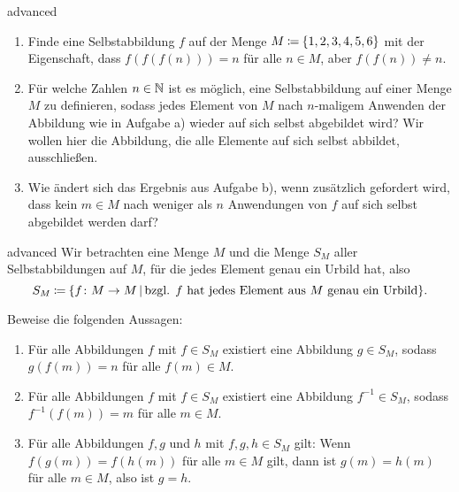 \documentclass[../funktionen.tex]{subfiles}
\begin{document}
\begin{exercise}{advanced}
    \begin{enumerate}
        \item Finde eine Selbstabbildung $f$ auf der Menge $M\mathbin{\coloneqq}\{1,2,3,4,5,6\}$ mit der Eigenschaft, dass $f(f(f(n)))=n$ für alle $n\in M$, aber $f(f(n))\neq n$.
        \item Für welche Zahlen $n\in\mathbb{N}$ ist es möglich, eine Selbstabbildung auf einer Menge $M$ zu definieren, sodass jedes Element von $M$ nach $n$-maligem Anwenden der Abbildung wie in Aufgabe a) wieder auf sich selbst abgebildet wird? Wir wollen hier die Abbildung, die alle Elemente auf sich selbst abbildet, ausschließen.
        \item Wie ändert sich das Ergebnis aus Aufgabe b), wenn zusätzlich gefordert wird, dass kein $m\in M$ nach weniger als $n$ Anwendungen von $f$ auf sich selbst abgebildet werden darf?
    \end{enumerate}
\end{exercise}

\begin{exercise}{advanced}
    Wir betrachten eine Menge $M$ und die Menge $S_M$ aller Selbstabbildungen auf $M$, für die jedes Element genau ein Urbild hat, also \[S_M\mathbin{\coloneqq}\{f\colon M\rightarrow M\,|\,\text{bzgl. $f$ hat jedes Element aus $M$ genau ein Urbild}\}.\]
    
    Beweise die folgenden Aussagen:
    \begin{enumerate}
        \item Für alle Abbildungen $f$ mit $f\in S_M$ existiert eine Abbildung $g\in S_M$, sodass \mbox{$g(f(m))=n$} für alle $f(m)\in M$.
        \item Für alle Abbildungen $f$ mit $f\in S_M$ existiert eine Abbildung $f^{-1}\in S_M$, sodass $f^{-1}(f(m))=m$ für alle $m\in M$.
        \item Für alle Abbildungen $f,g$ und $h$ mit $f,g,h\in S_M$ gilt: Wenn $f(g(m))=f(h(m))$ für alle $m\in M$ gilt, dann ist $g(m)=h(m)$ für alle $m\in M$, also ist $g=h$.
    \end{enumerate}
\end{exercise}
\end{document}
